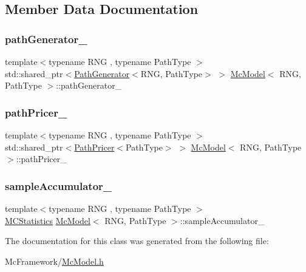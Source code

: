 \subsection{Member Data Documentation}
\hypertarget{class_mc_model_abb4ba15045ba3c05d2f54340a63a1000}{}\label{class_mc_model_abb4ba15045ba3c05d2f54340a63a1000} 
\subsubsection{\texorpdfstring{path\+Generator\+\_\+}{pathGenerator\_}}
{\footnotesize\ttfamily template$<$typename R\+NG , typename Path\+Type $>$ \\
std\+::shared\+\_\+ptr$<$\hyperlink{class_path_generator}{Path\+Generator}$<$R\+NG, Path\+Type$>$ $>$ \hyperlink{class_mc_model}{Mc\+Model}$<$ R\+NG, Path\+Type $>$\+::path\+Generator\+\_\+\hspace{0.3cm}{\ttfamily [private]}}

\hypertarget{class_mc_model_aa05affe30ae38a403977d3b708d46608}{}\label{class_mc_model_aa05affe30ae38a403977d3b708d46608} 
\subsubsection{\texorpdfstring{path\+Pricer\+\_\+}{pathPricer\_}}
{\footnotesize\ttfamily template$<$typename R\+NG , typename Path\+Type $>$ \\
std\+::shared\+\_\+ptr$<$\hyperlink{class_path_pricer}{Path\+Pricer}$<$Path\+Type$>$ $>$ \hyperlink{class_mc_model}{Mc\+Model}$<$ R\+NG, Path\+Type $>$\+::path\+Pricer\+\_\+\hspace{0.3cm}{\ttfamily [private]}}

\hypertarget{class_mc_model_a3ec600743d8341a4cd46b5005a0f70ff}{}\label{class_mc_model_a3ec600743d8341a4cd46b5005a0f70ff} 
\subsubsection{\texorpdfstring{sample\+Accumulator\+\_\+}{sampleAccumulator\_}}
{\footnotesize\ttfamily template$<$typename R\+NG , typename Path\+Type $>$ \\
\hyperlink{class_m_c_statistics}{M\+C\+Statistics} \hyperlink{class_mc_model}{Mc\+Model}$<$ R\+NG, Path\+Type $>$\+::sample\+Accumulator\+\_\+\hspace{0.3cm}{\ttfamily [private]}}



The documentation for this class was generated from the following file\+:\begin{DoxyCompactItemize}
\item 
Mc\+Framework/\hyperlink{_mc_model_8h}{Mc\+Model.\+h}\end{DoxyCompactItemize}
